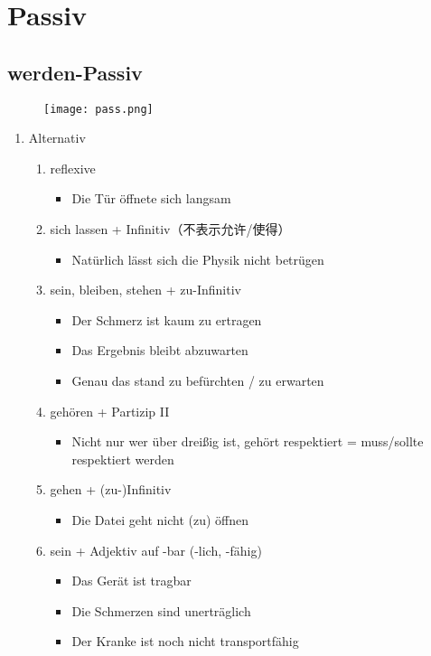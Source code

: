 \documentclass[UTF8]{report}
\begin{document}
\section{Passiv}
\subsection{werden-Passiv}
\begin{figure}[H]
    \centering
    \texttt{[image: pass.png]}
\end{figure}
\begin{enumerate}
    \item Alternativ
    \begin{enumerate}
        \item reflexive
        \begin{itemize}
            \item Die Tür öffnete sich langsam
        \end{itemize}
        \item sich lassen + Infinitiv（不表示允许/使得）
        \begin{itemize}
            \item Natürlich lässt sich die Physik nicht betrügen
        \end{itemize}
        \item sein, bleiben, stehen + zu-Infinitiv
        \begin{itemize}
            \item Der Schmerz ist kaum zu ertragen
            \item Das Ergebnis bleibt abzuwarten
            \item Genau das stand zu befürchten / zu erwarten
        \end{itemize}
        \item gehören + Partizip II
        \begin{itemize}
            \item Nicht nur wer über dreißig ist, gehört respektiert = muss/sollte respektiert werden
        \end{itemize}
        \item gehen + (zu-)Infinitiv
        \begin{itemize}
            \item Die Datei geht nicht (zu) öffnen
        \end{itemize}
        \item sein + Adjektiv auf -bar (-lich, -fähig)
        \begin{itemize}
            \item Das Gerät ist tragbar
            \item Die Schmerzen sind unerträglich
            \item Der Kranke ist noch nicht transportfähig
        \end{itemize}
    \end{enumerate}
\end{enumerate}
\end{document}
